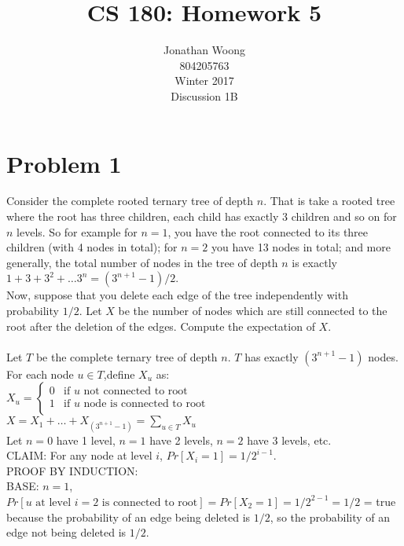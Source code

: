 \documentclass[10pt,letterpaper]{article}
\date{\displaydate{date}}
\newcommand\tab[1][0.5cm]{\hspace*{#1}}
\begin{document}
\title{CS 180: Homework 5}
\author{
	Jonathan Woong\\
	804205763\\
	Winter 2017\\
	Discussion 1B}
\maketitle
\pagebreak


\section{Problem 1}
Consider the complete rooted ternary tree of depth $n$. That is take a rooted tree where the root has three children, each child has exactly 3 children and so on for $n$ levels. So for example for $n=1$, you have the root connected to its three children (with 4 nodes in total); for $n=2$ you have 13 nodes in total; and more generally, the total number of nodes in the tree of depth $n$ is exactly $1+3+3^2+\dots3^n=(3^{n+1}-1)/2$.\\
Now, suppose that you delete each edge of the tree independently with probability $1/2$. Let $X$ be the number of nodes which are still connected to the root after the deletion of the edges. Compute the expectation of $X$.\\\\
Let $T$ be the complete ternary tree of depth $n$. $T$ has exactly $(3^{n+1}-1)$ nodes.\\
For each node $u \in T$,define $X_u$ as:\\
\tab $X_u =
\begin{cases}
0 & \text{if $u$ not connected to root}\\
1 & \text{if $u$ node is connected to root}\\
\end{cases}$\\
$X = X_1 + \dots + X_{(3^{n+1}-1)} = \sum_{u \in T}X_u$\\
Let $n=0$ have 1 level, $n=1$ have 2 levels, $n=2$ have 3 levels, etc.\\
CLAIM: For any node at level $i$, $Pr[X_i=1]=1/2^{i-1}$.\\
PROOF BY INDUCTION:\\
BASE: $n=1$, $Pr[u \text{ at level $i=2$ is connected to root}] = Pr[X_2=1]=1/2^{2-1}=1/2$ = true because the probability of an edge being deleted is $1/2$, so the probability of an edge not being deleted is $1/2$.\\
\end{document}
